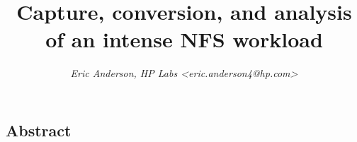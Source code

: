 \documentclass[twocolumn, 10pt]{article}
\begin{document}
\title{\Large \bf Capture, conversion, and analysis of an intense NFS workload}

\author{{\it Eric Anderson, HP Labs <eric.anderson4@hp.com>}}
\date{}
\maketitle


\subsection*{Abstract}









\end{document}
